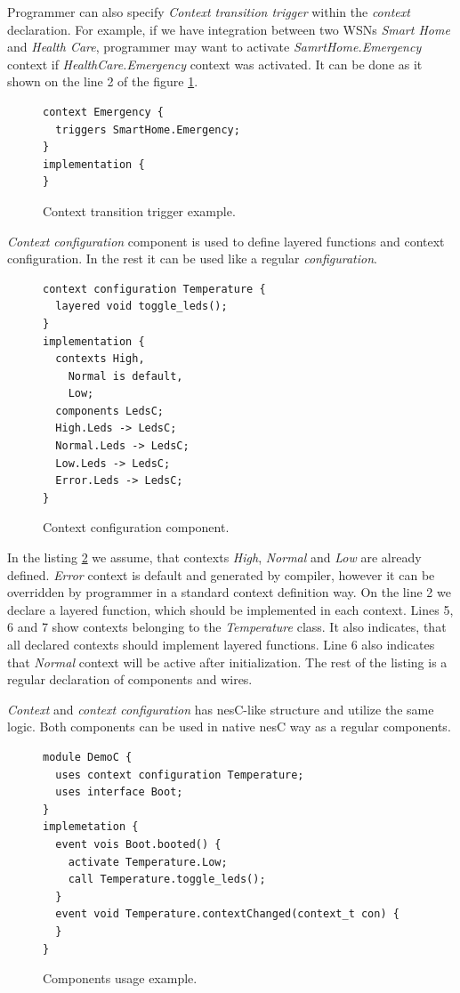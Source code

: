 \documentclass{ubicomp-ext}
\begin{document}
Programmer can also specify \textit{Context transition trigger} within the \textit{context} declaration. For example, if we have integration between two WSNs \textit{Smart Home} and \textit{Health Care}, programmer may want to activate \textit{SamrtHome.Emergency} context if \textit{HealthCare.Emergency} context was activated. It can be done as it shown on the line 2 of the figure \ref{fig:ctre}.

\begin{figure}[H]
\begin{lstlisting}
context Emergency {
  triggers SmartHome.Emergency;
}
implementation {
}
\end{lstlisting}
\caption{Context transition trigger example.}
\label{fig:ctre}
\end{figure}

\textit{Context configuration} component is used to define layered functions and context configuration. In the rest it can be used like a regular \textit{configuration}.

\begin{figure}
\begin{lstlisting}
context configuration Temperature {
  layered void toggle_leds();
}
implementation {
  contexts High,
    Normal is default,
    Low;
  components LedsC;
  High.Leds -> LedsC;
  Normal.Leds -> LedsC;
  Low.Leds -> LedsC;
  Error.Leds -> LedsC;
}
\end{lstlisting}
\caption{Context configuration component.}
\label{fig:ccc}
\end{figure}

In the listing \ref{fig:ccc} we assume, that contexts \textit{High}, \textit{Normal} and \textit{Low} are already defined. \textit{Error} context is default and generated by compiler, however it can be overridden by programmer in a standard context definition way. On the line 2 we declare a layered function, which should be implemented in each context. Lines 5, 6 and 7 show contexts belonging to the \textit{Temperature} class. It also indicates, that all declared contexts should implement layered functions. Line 6 also indicates that \textit{Normal} context will be active after initialization. The rest of the listing is a regular declaration of components and wires.

\textit{Context} and \textit{context configuration} has nesC-like structure and utilize the same logic. Both components can be used in native nesC way as a regular components.

\begin{figure}
\begin{lstlisting}
module DemoC {
  uses context configuration Temperature;
  uses interface Boot;
}
implemetation {
  event vois Boot.booted() {
    activate Temperature.Low;
    call Temperature.toggle_leds();
  }
  event void Temperature.contextChanged(context_t con) {
  }
}
\end{lstlisting}
\caption{Components usage example.}
\label{fig:cue}
\end{figure}
\end{document}
